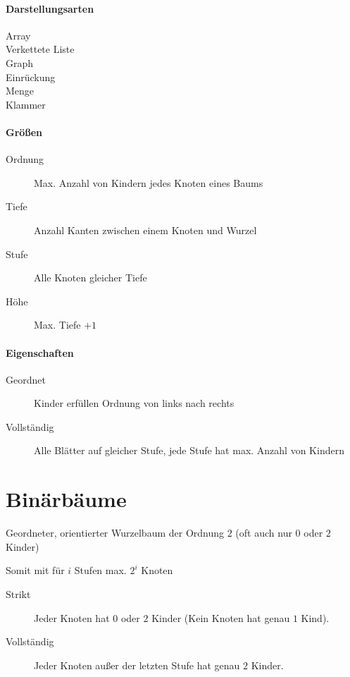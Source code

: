 \paragraph{Darstellungsarten}

\begin{description}
  \item[Array]
  \item[Verkettete Liste]
  \item[Graph]
  \item[Einrückung]
  \item[Menge]
  \item[Klammer]
\end{description}

\paragraph{Grö\ss en}

\begin{description}
  \item[Ordnung] Max. Anzahl von Kindern jedes Knoten eines Baums

  \item[Tiefe] Anzahl Kanten zwischen einem Knoten und Wurzel

  \item[Stufe] Alle Knoten gleicher Tiefe

  \item[Höhe] Max. Tiefe $+ 1$
\end{description}

\paragraph{Eigenschaften}

\begin{description}
  \item[Geordnet] Kinder erfüllen Ordnung von links nach rechts

  \item[Vollständig]
    Alle Blätter auf gleicher Stufe, jede Stufe hat max. Anzahl von Kindern
\end{description}

\section{Binärbäume}

Geordneter, orientierter Wurzelbaum der Ordnung $2$ (oft auch nur $0$ oder $2$ Kinder)

Somit mit für $i$ Stufen max. $2^i$ Knoten

\begin{description}
  \item[Strikt]
    Jeder Knoten hat $0$ oder $2$ Kinder (Kein Knoten hat genau $1$ Kind).

  \item[Vollständig]
    Jeder Knoten außer der letzten Stufe hat genau $2$ Kinder.
\end{description}